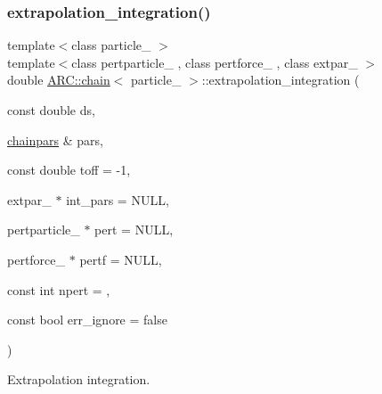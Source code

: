 \subsubsection{\texorpdfstring{extrapolation\+\_\+integration()}{extrapolation\_integration()}}
{\footnotesize\ttfamily template$<$class particle\+\_\+ $>$ \\
template$<$class pertparticle\+\_\+ , class pertforce\+\_\+ , class extpar\+\_\+ $>$ \\
double \hyperlink{classARC_1_1chain}{A\+R\+C\+::chain}$<$ particle\+\_\+ $>$\+::extrapolation\+\_\+integration (\begin{DoxyParamCaption}\item[{const double}]{ds,  }\item[{\hyperlink{classARC_1_1chainpars}{chainpars} \&}]{pars,  }\item[{const double}]{toff = {\ttfamily -\/1},  }\item[{extpar\+\_\+ $\ast$}]{int\+\_\+pars = {\ttfamily NULL},  }\item[{pertparticle\+\_\+ $\ast$}]{pert = {\ttfamily NULL},  }\item[{pertforce\+\_\+ $\ast$}]{pertf = {\ttfamily NULL},  }\item[{const int}]{npert = {},  }\item[{const bool}]{err\+\_\+ignore = {\ttfamily false} }\end{DoxyParamCaption})\hspace{0.3cm}{\ttfamily [inline]}}



Extrapolation integration. 

